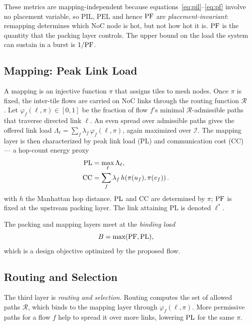 These metrics are mapping-independent because equations~\eqref{eq:pil}--\eqref{eq:pf} involve no placement variable, so $\mathrm{PIL}$, $\mathrm{PEL}$ and hence
$\mathrm{PF}$ are \emph{placement-invariant}: remapping determines which NoC node is
hot, but not how hot it is. $\mathrm{PF}$ is the quantity that the packing layer controls. The upper bound on the load the system can sustain in a burst is $1/\mathrm{PF}$.

\subsection{Mapping: Peak Link Load}
\label{sec:mapping} 
A mapping is an injective function $\pi$ that assigns tiles to mesh nodes. Once $\pi$ is fixed, the inter-tile flows are carried on NoC links through the routing function $\mathcal{R}$. Let $\varphi_f(\ell,\pi)\in[0,1]$ be the
fraction of flow $f$'s minimal $\mathcal{R}$-admissible paths that traverse
directed link $\ell$. An even spread over admissible paths gives the offered link load $\Lambda_\ell = \sum_f \lambda_f\,\varphi_f(\ell,\pi)$,
again maximized over $\mathcal{I}$. The mapping layer is then characterized by peak link load (PL) and communication cost (CC) --- a hop-count energy proxy
\begin{align}
  \mathrm{PL} &= \max_{\ell} \Lambda_\ell,
  \label{eq:pl}\\
  \mathrm{CC} &= \sum_f \lambda_f\, h\!\left(\pi(u_f),\pi(v_f)\right).
  \label{eq:cc}
\end{align}
with $h$ the Manhattan hop distance. $\mathrm{PL}$ and $\mathrm{CC}$ are determined by $\pi$; $\mathrm{PF}$ is fixed at the upstream packing layer. The link attaining PL is denoted $\ell^{*}$.

The packing and mapping layers meet at the \emph{binding load}
\begin{equation}
  B = \max(\mathrm{PF}, \mathrm{PL}),
  \label{eq:bind}
\end{equation}
which is a design objective optimized by the proposed flow.

\subsection{Routing and Selection}
\label{sec:routing}
The third layer is \emph{routing and selection}. Routing computes the set of allowed paths $\mathcal{R}$, which binds to the mapping layer through $\varphi_f(\ell,\pi)$. More permissive paths for a flow $f$ help to spread it over more links, lowering $\mathrm{PL}$ for the same $\pi$.

